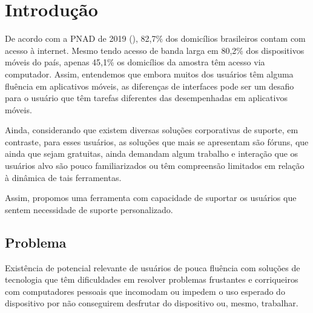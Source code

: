 \documentclass[
    12pt,               %
    openright,          %
    oneside,
    a4paper,            %
    MODELO,             %
    english,            %
    brazil              %
   ]{ifsp-spo-inf-ctds}
\begin{document}
\frenchspacing 

\pretextual

\imprimirfolhaderosto

\textual

\chapter[Introdução]{Introdução}

De acordo com a PNAD de 2019 (\citeauthor{PNAD:2019}), 82,7\% dos domicílios brasileiros contam com acesso à internet. Mesmo tendo acesso de banda larga em 80,2\% dos dispositivos móveis do país, apenas 45,1\% os domicílios da amostra têm acesso via computador. Assim, entendemos que embora muitos dos usuários têm alguma fluência em aplicativos móveis, as diferenças de interfaces pode ser um desafio para o usuário que têm tarefas diferentes das desempenhadas em aplicativos móveis.

Ainda, considerando que existem diversas soluções corporativas de suporte, em contraste, para esses usuários, as soluções que mais se apresentam são fóruns, que ainda que sejam gratuitas, ainda demandam algum trabalho e interação que os usuários alvo são pouco familiarizados ou têm compreensão limitados em relação à dinâmica de tais ferramentas.

Assim, propomos uma ferramenta com capacidade de suportar os usuários que sentem necessidade de suporte personalizado.

\section{Problema}


Existência de potencial relevante de usuários de pouca fluência com soluções de tecnologia que têm dificuldades em resolver problemas frustantes e corriqueiros com computadores pessoais que  incomodam ou impedem o uso esperado do dispositivo por não conseguirem desfrutar do dispositivo ou, mesmo, trabalhar.
\end{document}
